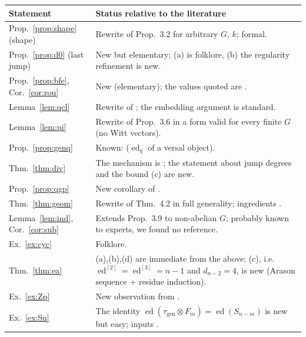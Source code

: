 \documentclass[11pt]{amsart}
\theoremstyle{definition}
\theoremstyle{remark}
\newcommand{\ed}{\operatorname{ed}}
\newcommand{\edd}[1]{\ed^{[#1]}}
\newcommand{\gen}{\mathrm{gen}}
\begin{document}
\begin{center}
\small
\begin{tabular}{@{}p{}p{}@{}}
\toprule
Statement & Status relative to the literature\\
\midrule
Prop.~\ref{prop:shape} (shape) & Rewrite of Prop.~3.2 for arbitrary $G$, $k$; formal.\\
Prop.~\ref{prop:d0} (last jump) & New but elementary; (a) is folklore, (b) the
regularity refinement is new.\\
Prop.~\ref{prop:bfe}, Cor.~\ref{cor:rou} & New (elementary); the values quoted are
\cite{BR,KM}.\\
Lemma~\ref{lem:qcl} & Rewrite of \cite[(2.5)]{RS}; the embedding argument is standard.\\
Lemma~\ref{lem:pi} & Rewrite of Prop.~3.6 in a form valid for every finite $G$
(no Witt vectors).\\
Prop.~\ref{prop:genq} & Known: \cite{RS,Me} ($\ed_q$ of a versal object).\\
Thm.~\ref{thm:div} & The mechanism is \cite[Thm.~10.1]{RS}; the statement about jump
degrees and the bound (c) are new.\\
Prop.~\ref{prop:qgp} & New corollary of \cite{KM}.\\
Thm.~\ref{thm:geom} & Rewrite of Thm.~4.2 in full generality; ingredients
\cite{DR,RS}.\\
Lemma~\ref{lem:ind}, Cor.~\ref{cor:sub} & Extends Prop.~3.9 to non-abelian $G$;
probably known to experts, we found no reference.\\
Ex.~\ref{ex:cyc} & Folklore.\\
Thm.~\ref{thm:ea} & (a),(b),(d) are immediate from the above; (c), i.e.\
$\edd2=\edd3=n-1$ and $d_{n-2}=4$, is new (Arason sequence \cite{Ar} + residue
induction).\\
Ex.~\ref{ex:Zp} & New observation from \cite{Le07}.\\
Ex.~\ref{ex:Sn} & The identity $\ed(\tau_\gen\otimes F_m)=\ed(S_{n-m})$ is new but
easy; inputs \cite{BR,MR}.\\
\bottomrule
\end{tabular}
\end{center}
\end{document}
